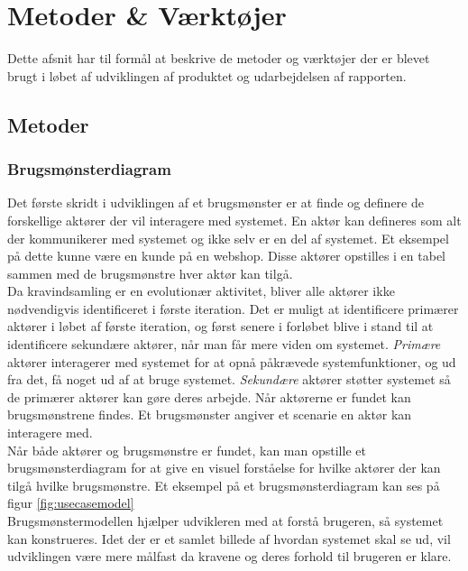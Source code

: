 \section{Metoder \& Værktøjer}
Dette afsnit har til formål at beskrive de metoder og værktøjer der er blevet brugt i løbet af udviklingen af produktet og udarbejdelsen af rapporten. 

\subsection{Metoder}
\subsubsection{Brugsmønsterdiagram}
Det første skridt i udviklingen af et brugsmønster er at finde og definere de forskellige aktører der vil interagere med systemet. En aktør kan defineres som alt der kommunikerer med systemet og ikke selv er en del af systemet. Et eksempel på dette kunne være en kunde på en webshop. Disse aktører opstilles i en tabel sammen med de brugsmønstre hver aktør kan tilgå. \\

\noindent
Da kravindsamling er en evolutionær aktivitet, bliver alle aktører ikke nødvendigvis identificeret i første iteration. Det er muligt at identificere primærer aktører i løbet af første iteration, og først senere i forløbet blive i stand til at identificere sekundære aktører, når man får mere viden om systemet. \textit{Primære} aktører interagerer med systemet for at opnå påkrævede systemfunktioner, og ud fra det, få noget ud af at bruge systemet. \textit{Sekundære} aktører støtter systemet så de primærer aktører kan gøre deres arbejde. Når aktørerne er fundet kan brugsmønstrene findes. Et brugsmønster angiver et scenarie en aktør kan interagere med. \\

\noindent
Når både aktører og brugsmønstre er fundet, kan man opstille et brugsmønsterdiagram for at give en visuel forståelse for hvilke aktører der kan tilgå hvilke brugsmønstre. Et eksempel på et brugsmønsterdiagram kan ses på figur \ref{fig:usecasemodel} \\

\noindent
Brugsmønstermodellen hjælper udvikleren med at forstå brugeren, så systemet kan konstrueres. Idet der er et samlet billede af hvordan systemet skal se ud, vil udviklingen være mere målfast da kravene og deres forhold til brugeren er klare.


